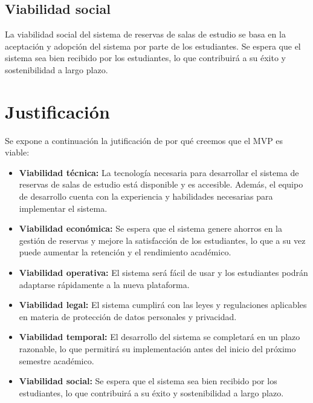 \documentclass{article}
\begin{document}
      \subsection{Viabilidad social}
      La viabilidad social del sistema de reservas de salas de estudio se basa en la aceptación y adopción del sistema por parte de los estudiantes. Se espera que el sistema sea bien recibido por los estudiantes, lo que contribuirá a su éxito y sostenibilidad a largo plazo.

      \newpage

      \section{Justificación}

      Se expone a continuación la jutificación de por qué creemos que el MVP es viable:

      \begin{itemize}
        \item \textbf{Viabilidad técnica:} La tecnología necesaria para desarrollar el sistema de reservas de salas de estudio está disponible y es accesible. Además, el equipo de desarrollo cuenta con la experiencia y habilidades necesarias para implementar el sistema.
        \item \textbf{Viabilidad económica:} Se espera que el sistema genere ahorros en la gestión de reservas y mejore la satisfacción de los estudiantes, lo que a su vez puede aumentar la retención y el rendimiento académico.
        \item \textbf{Viabilidad operativa:} El sistema será fácil de usar y los estudiantes podrán adaptarse rápidamente a la nueva plataforma.
        \item \textbf{Viabilidad legal:} El sistema cumplirá con las leyes y regulaciones aplicables en materia de protección de datos personales y privacidad.
        \item \textbf{Viabilidad temporal:} El desarrollo del sistema se completará en un plazo razonable, lo que permitirá su implementación antes del inicio del próximo semestre académico.
        \item \textbf{Viabilidad social:} Se espera que el sistema sea bien recibido por los estudiantes, lo que contribuirá a su éxito y sostenibilidad a largo plazo.
        \end{itemize}

      
\end{document}
